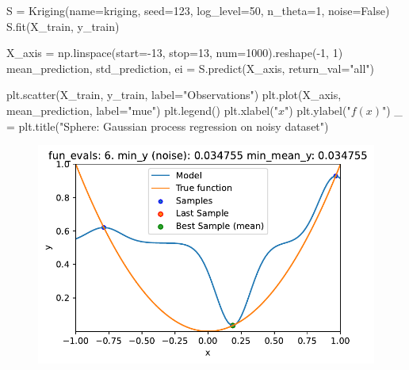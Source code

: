 \documentclass[
  letterpaper,
  DIV=11,
  numbers=noendperiod]{scrreprt}
\newenvironment{Shaded}{\begin{snugshade}}{\end{snugshade}}
\newcommand{\DecValTok}[1]{\textcolor[rgb]{0.68,0.00,0.00}{#1}}
\newcommand{\NormalTok}[1]{\textcolor[rgb]{0.00,0.23,0.31}{#1}}
\newcommand{\OperatorTok}[1]{\textcolor[rgb]{0.37,0.37,0.37}{#1}}
\newcommand{\StringTok}[1]{\textcolor[rgb]{0.13,0.47,0.30}{#1}}
\newcommand{\VariableTok}[1]{\textcolor[rgb]{0.07,0.07,0.07}{#1}}
\begin{document}
\begin{Shaded}
\begin{Highlighting}[]
\NormalTok{S }\OperatorTok{=}\NormalTok{ Kriging(name}\OperatorTok{=}\StringTok{\textquotesingle{}kriging\textquotesingle{}}\NormalTok{,}
\NormalTok{            seed}\OperatorTok{=}\DecValTok{123}\NormalTok{,}
\NormalTok{            log\_level}\OperatorTok{=}\DecValTok{50}\NormalTok{,}
\NormalTok{            n\_theta}\OperatorTok{=}\DecValTok{1}\NormalTok{,}
\NormalTok{            noise}\OperatorTok{=}\VariableTok{False}\NormalTok{)}
\NormalTok{S.fit(X\_train, y\_train)}

\NormalTok{X\_axis }\OperatorTok{=}\NormalTok{ np.linspace(start}\OperatorTok{={-}}\DecValTok{13}\NormalTok{, stop}\OperatorTok{=}\DecValTok{13}\NormalTok{, num}\OperatorTok{=}\DecValTok{1000}\NormalTok{).reshape(}\OperatorTok{{-}}\DecValTok{1}\NormalTok{, }\DecValTok{1}\NormalTok{)}
\NormalTok{mean\_prediction, std\_prediction, ei }\OperatorTok{=}\NormalTok{ S.predict(X\_axis, return\_val}\OperatorTok{=}\StringTok{"all"}\NormalTok{)}

\NormalTok{plt.scatter(X\_train, y\_train, label}\OperatorTok{=}\StringTok{"Observations"}\NormalTok{)}
\NormalTok{plt.plot(X\_axis, mean\_prediction, label}\OperatorTok{=}\StringTok{"mue"}\NormalTok{)}
\NormalTok{plt.legend()}
\NormalTok{plt.xlabel(}\StringTok{"$x$"}\NormalTok{)}
\NormalTok{plt.ylabel(}\StringTok{"$f(x)$"}\NormalTok{)}
\NormalTok{\_ }\OperatorTok{=}\NormalTok{ plt.title(}\StringTok{"Sphere: Gaussian process regression on noisy dataset"}\NormalTok{)}
\end{Highlighting}
\end{Shaded}

\begin{figure}[H]

{\centering \includegraphics{013_num_spot_noisy_files/figure-pdf/cell-10-output-1.pdf}

}

\end{figure}
\end{document}
